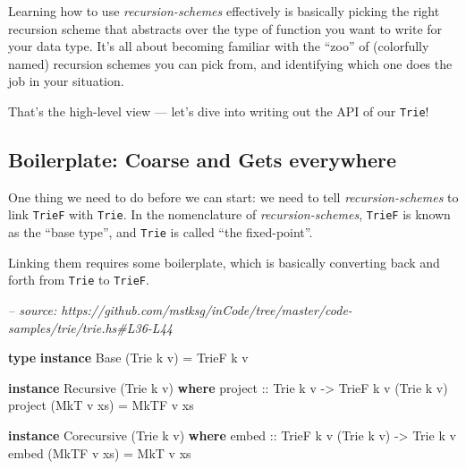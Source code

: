 \documentclass[]{article}
\newenvironment{Shaded}{}{}
\newcommand{\CommentTok}[1]{\textcolor[rgb]{0.38,0.63,0.69}{\textit{#1}}}
\newcommand{\DataTypeTok}[1]{\textcolor[rgb]{0.56,0.13,0.00}{#1}}
\newcommand{\FunctionTok}[1]{\textcolor[rgb]{0.02,0.16,0.49}{#1}}
\newcommand{\KeywordTok}[1]{\textcolor[rgb]{0.00,0.44,0.13}{\textbf{#1}}}
\newcommand{\NormalTok}[1]{#1}
\newcommand{\OtherTok}[1]{\textcolor[rgb]{0.00,0.44,0.13}{#1}}
\begin{document}
Learning how to use \emph{recursion-schemes} effectively is basically picking
the right recursion scheme that abstracts over the type of function you want to
write for your data type. It's all about becoming familiar with the ``zoo'' of
(colorfully named) recursion schemes you can pick from, and identifying which
one does the job in your situation.

That's the high-level view --- let's dive into writing out the API of our
\texttt{Trie}!

\hypertarget{boilerplate-coarse-and-gets-everywhere}{%
\subsection{Boilerplate: Coarse and Gets
everywhere}\label{boilerplate-coarse-and-gets-everywhere}}

One thing we need to do before we can start: we need to tell
\emph{recursion-schemes} to link \texttt{TrieF} with \texttt{Trie}. In the
nomenclature of \emph{recursion-schemes}, \texttt{TrieF} is known as the ``base
type'', and \texttt{Trie} is called ``the fixed-point''.

Linking them requires some boilerplate, which is basically converting back and
forth from \texttt{Trie} to \texttt{TrieF}.

\begin{Shaded}
\begin{Highlighting}[]
\CommentTok{-- source: https://github.com/mstksg/inCode/tree/master/code-samples/trie/trie.hs#L36-L44}

\KeywordTok{type} \KeywordTok{instance} \DataTypeTok{Base}\NormalTok{ (}\DataTypeTok{Trie}\NormalTok{ k v) }\FunctionTok{=} \DataTypeTok{TrieF}\NormalTok{ k v}

\KeywordTok{instance} \DataTypeTok{Recursive}\NormalTok{ (}\DataTypeTok{Trie}\NormalTok{ k v) }\KeywordTok{where}
\OtherTok{    project ::} \DataTypeTok{Trie}\NormalTok{ k v }\OtherTok{->} \DataTypeTok{TrieF}\NormalTok{ k v (}\DataTypeTok{Trie}\NormalTok{ k v)}
\NormalTok{    project (}\DataTypeTok{MkT}\NormalTok{ v xs) }\FunctionTok{=} \DataTypeTok{MkTF}\NormalTok{ v xs}

\KeywordTok{instance} \DataTypeTok{Corecursive}\NormalTok{ (}\DataTypeTok{Trie}\NormalTok{ k v) }\KeywordTok{where}
\OtherTok{    embed ::} \DataTypeTok{TrieF}\NormalTok{ k v (}\DataTypeTok{Trie}\NormalTok{ k v) }\OtherTok{->} \DataTypeTok{Trie}\NormalTok{ k v}
\NormalTok{    embed (}\DataTypeTok{MkTF}\NormalTok{ v xs) }\FunctionTok{=} \DataTypeTok{MkT}\NormalTok{ v xs}
\end{Highlighting}
\end{Shaded}
\end{document}
